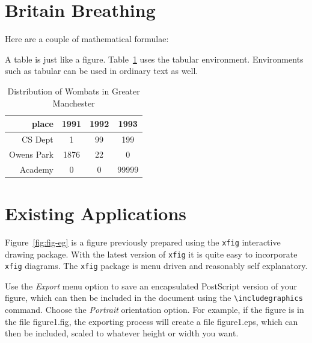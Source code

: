 \cite{urlasthmacauses}

\section{Britain Breathing}

Here are a couple of mathematical formulae:


A table is just like a figure. Table~\ref{wombat} uses the tabular
environment.  Environments such as tabular can be used in ordinary
text as well.
\begin{table}
\begin{center}
\begin{tabular}{|r|c|c|c|}\hline\hline
place&1991&1992&1993\\\hline
CS Dept& 1&99&199\\
Owens Park& 1876& 22&0\\
Academy&0&0&99999\\\hline\hline
\end{tabular}
\end{center}
\caption{Distribution of Wombats in Greater Manchester}\label{wombat}
\end{table}


\section{Existing Applications}
\label{sec:diagrams}

Figure~\ref{fig:fig-eg} is a figure previously prepared using the
\texttt{xfig} interactive drawing package. With the latest version of
\texttt{xfig} it is quite easy to incorporate \texttt{xfig} diagrams.
The \texttt{xfig} package is menu driven and reasonably self
explanatory.

Use the \emph{Export} menu option to save an encapsulated PostScript
version of your figure, which can then be included in the document
using the \verb=\includegraphics= command. Choose the \emph{Portrait}
orientation option. For example, if the figure is in the file \textsf{
  figure1.fig}, the exporting process will create a file \textsf{
  figure1.eps}, which can then be included, scaled to whatever height
or width you want.


